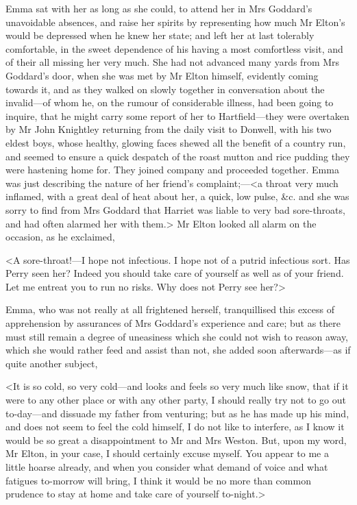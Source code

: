 Emma sat with her as long as she could, to attend her in Mrs Goddard's unavoidable absences, and raise her spirits by representing how much Mr Elton's would be depressed when he knew her state; and left her at last tolerably comfortable, in the sweet dependence of his having a most comfortless visit, and of their all missing her very much. She had not advanced many yards from Mrs Goddard's door, when she was met by Mr Elton himself, evidently coming towards it, and as they walked on slowly together in conversation about the invalid—of whom he, on the rumour of considerable illness, had been going to inquire, that he might carry some report of her to Hartfield—they were overtaken by Mr John Knightley returning from the daily visit to Donwell, with his two eldest boys, whose healthy, glowing faces shewed all the benefit of a country run, and seemed to ensure a quick despatch of the roast mutton and rice pudding they were hastening home for. They joined company and proceeded together. Emma was just describing the nature of her friend's complaint;—<a throat very much inflamed, with a great deal of heat about her, a quick, low pulse, \&c. and she was sorry to find from Mrs Goddard that Harriet was liable to very bad sore-throats, and had often alarmed her with them.> Mr Elton looked all alarm on the occasion, as he exclaimed,

<A sore-throat!—I hope not infectious. I hope not of a putrid infectious sort. Has Perry seen her? Indeed you should take care of yourself as well as of your friend. Let me entreat you to run no risks. Why does not Perry see her?>

Emma, who was not really at all frightened herself, tranquillised this excess of apprehension by assurances of Mrs Goddard's experience and care; but as there must still remain a degree of uneasiness which she could not wish to reason away, which she would rather feed and assist than not, she added soon afterwards—as if quite another subject,

<It is so cold, so very cold—and looks and feels so very much like snow, that if it were to any other place or with any other party, I should really try not to go out to-day—and dissuade my father from venturing; but as he has made up his mind, and does not seem to feel the cold himself, I do not like to interfere, as I know it would be so great a disappointment to Mr and Mrs Weston. But, upon my word, Mr Elton, in your case, I should certainly excuse myself. You appear to me a little hoarse already, and when you consider what demand of voice and what fatigues to-morrow will bring, I think it would be no more than common prudence to stay at home and take care of yourself to-night.>

